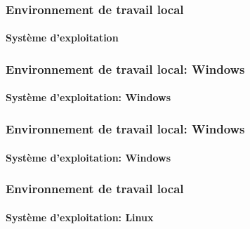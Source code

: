 \documentclass{beamer}
\begin{document}
\begin{frame}
\frametitle{Environnement de travail local}
\framesubtitle{Système d'exploitation}



\end{frame}

\begin{frame}
\frametitle{Environnement de travail local: Windows}
\framesubtitle{Système d'exploitation: Windows}

\end{frame}

\begin{frame}
\frametitle{Environnement de travail local: Windows}
\framesubtitle{Système d'exploitation: Windows}

\end{frame}

\begin{frame}
\frametitle{Environnement de travail local}
\framesubtitle{Système d'exploitation: Linux}

\end{frame}
\end{document}
